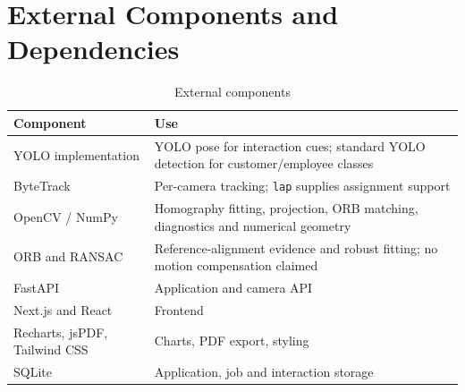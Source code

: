 \section{External Components and Dependencies}
\begin{table}[H]
\centering
\caption{External components}
\begin{tabular}{P{0.25\textwidth}P{0.62\textwidth}}
\toprule
Component & Use\\
\midrule
YOLO implementation \cite{ultralytics} & YOLO pose for interaction cues; standard YOLO detection for customer/employee classes\\
ByteTrack \cite{zhang2022bytetrack} & Per-camera tracking; \texttt{lap} supplies assignment support\\
OpenCV / NumPy \cite{opencvHomography} & Homography fitting, projection, ORB matching, diagnostics and numerical geometry\\
ORB \cite{rublee2011orb} and RANSAC \cite{fischler1981ransac} & Reference-alignment evidence and robust fitting; no motion compensation claimed\\
FastAPI \cite{fastapi} & Application and camera API\\
Next.js and React \cite{nextjs} & Frontend\\
Recharts, jsPDF, Tailwind CSS & Charts, PDF export, styling\\
SQLite & Application, job and interaction storage\\
\bottomrule
\end{tabular}
\end{table}
